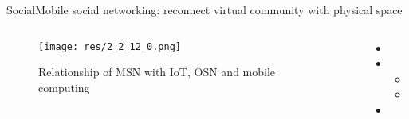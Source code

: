 \begin{frame}{Social}{Mobile social networking: reconnect virtual community with physical space \cite{zhang_mobile_2013}}

	\begin{columns}
		\begin{column}{0.7\textwidth}
			\begin{center}
			
				\begin{figure}
					\texttt{[image: res/2\_2\_12\_0.png]}
					\caption{\label{fig:2_2_12_0}Relationship of MSN with IoT, OSN and mobile computing}
				\end{figure}
				
			\end{center}
		\end{column}
		
		\begin{column}{0.3\textwidth}
		
			\begin{itemize}
				\item 
				
				\item 
					\begin{itemize}
						\item 
						\item 
					\end{itemize}
				
				\item 
			\end{itemize}
			
		\end{column}
	\end{columns}
	

\end{frame}


